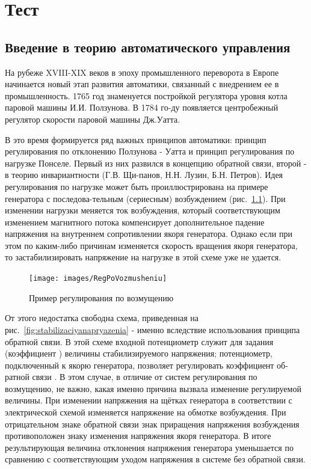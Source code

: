 \chapter{Тест}
\section{Введение в теорию автоматического управления}
На рубеже XVIII-XIX веков в эпоху промышленного переворота в Европе начинается новый этап развития автоматики, связанный с внедрением ее в промышленность. 1765 год знаменуется постройкой регулятора уровня котла паровой машины И.И. Ползунова. В 1784 го-ду появляется центробежный регулятор скорости паровой машины Дж.Уатта.

В это время формируется ряд важных принципов автоматики: принцип регулирования по отклонению Ползунова - Уатта и принцип регулирования по нагрузке Понселе. Первый из них развился в концепцию обратной связи, второй - в теорию инвариантности (Г.В. Щи-панов, Н.Н. Лузин, Б.Н. Петров). Идея регулирования по нагрузке может быть проиллюстрирована на примере генератора с последова-тельным (сериесным) возбуждением (рис.~\ref{fig:regpovozmusheniu}). При изменении нагрузки меняется ток возбуждения, который соответствующим изменением магнитного потока компенсирует дополнительное падение напряжения на внутреннем сопротивлении якоря генератора. Однако если при этом по каким-либо причинам изменяется скорость вращения якоря генератора, то застабилизировать напряжение на нагрузке в этой схеме уже не удается.

\begin{figure}[h]
	\centering
	\texttt{[image: images/RegPoVozmusheniu]}
	\caption{Пример регулирования по возмущению }
	\label{fig:regpovozmusheniu}
\end{figure}

От этого недостатка свободна схема, приведенная на рис.~\ref{fig:stabilizaciyanapryazenia} - именно вследствие использования принципа обратной связи. В этой схеме входной потенциометр служит для задания (коэффициент ) величины стабилизируемого напряжения; потенциометр, подключенный к якорю генератора, позволяет регулировать коэффициент об-ратной связи . В этом случае, в отличие от систем регулирования по возмущению, не важно, какая именно причина вызвала изменение регулируемой величины. При изменении напряжения на щётках генератора в соответствии с электрической схемой изменяется напряжение на обмотке возбуждения. При отрицательном знаке обратной связи знак приращения напряжения возбуждения противоположен знаку изменения напряжения якоря генератора. В итоге результирующая величина отклонения напряжения генератора уменьшается по сравнению с соответствующим уходом напряжения в системе без обратной связи. 

